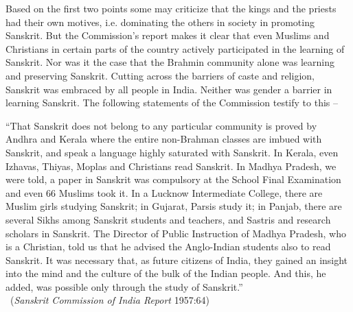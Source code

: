 Based on the first two points some may criticize that the kings and the priests had their own motives, i.e. dominating the others in society in promoting Sanskrit.  But the Commission’s report makes it clear that even Muslims and Christians in certain parts of the country actively participated in the learning of Sanskrit. Nor was it the case that the Brahmin community alone was learning and preserving Sanskrit. Cutting across the barriers of caste and religion, Sanskrit was embraced by all people in India. Neither was gender a barrier in learning Sanskrit. The following statements of the Commission testify to this – 
\begin{myquote}
\eleven
“That Sanskrit does not belong to any particular community is proved by Andhra and Kerala where the entire non-Brahman classes are imbued with Sanskrit, and speak a language highly saturated with Sanskrit. In Kerala, even Izhavas, Thiyas, Moplas and Christians read Sanskrit. In Madhya Pradesh, we were told, a paper in Sanskrit was compulsory at the School Final Examination and even 66 Muslims took it. In a Lucknow Intermediate College, there are Muslim girls studying Sanskrit; in Gujarat, Parsis study it; in Panjab, there are several Sikhs among Sanskrit students and teachers, and Sastris and research scholars in Sanskrit. The Director of Public Instruction of Madhya Pradesh, who is a Christian, told us that he advised the Anglo-Indian students also to read Sanskrit. It was necessary that, as future citizens of India, they gained an insight into the mind and the culture of the bulk of the Indian people. And this, he added, was possible only through the study of Sanskrit.”\\[-15pt]

~\hfill ({\sl Sanskrit Commission of India Report} 1957:64)
\end{myquote}

